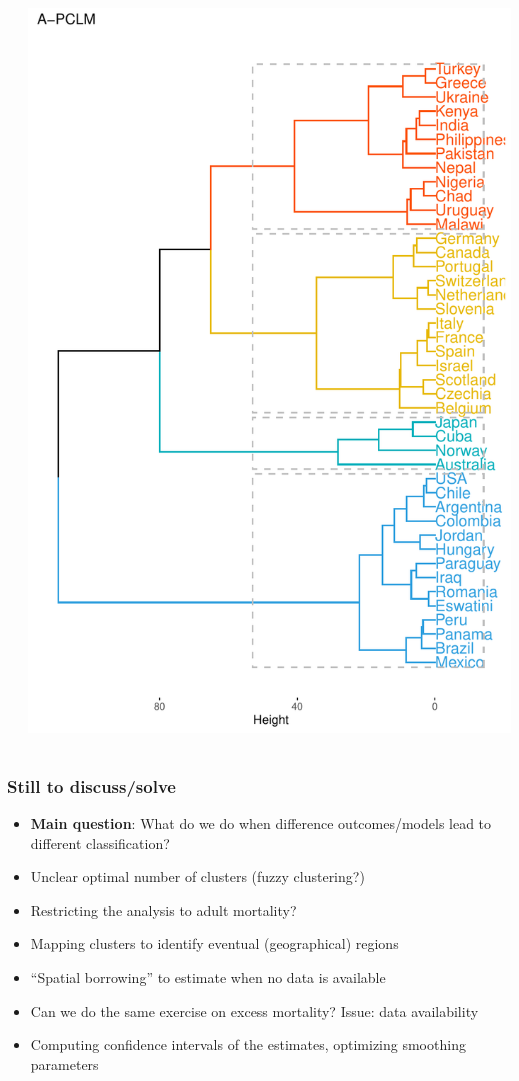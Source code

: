 \documentclass[table,xcdraw,dvipsnames]{beamer}
\begin{document}
\begin{frame}[fragile]
{\begin{columns}
\begin{column}{5cm}
		\end{column}
		\begin{column}{5cm}
			\includegraphics[scale=.35]{Figures/HierDendo.pdf}
		\end{column}
	\end{columns}
}
\end{frame}


\begin{frame}[fragile]\frametitle{Still to discuss/solve}
	\begin{itemize}
		\item \textbf{Main question}: What do we do when difference outcomes/models lead to different classification?
		\bigskip
		\item Unclear optimal number of clusters (fuzzy clustering?)
		\bigskip
		\item Restricting the analysis to adult mortality?
		\bigskip
		\item Mapping clusters to identify eventual (geographical) regions
		\bigskip
		\item ``Spatial borrowing'' to estimate when no data is available
		\bigskip
		\item Can we do the same exercise on excess mortality? Issue: data availability 
		\bigskip
		\item Computing confidence intervals of the estimates, optimizing smoothing parameters
\end{itemize}
\end{frame}
\end{document}
